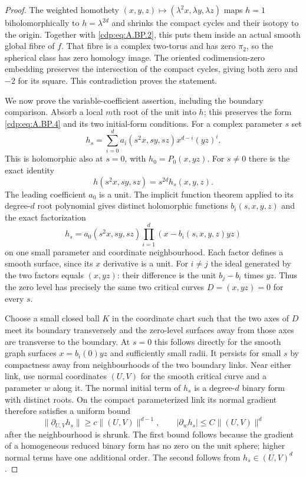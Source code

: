 \begin{proof}
The weighted homothety
$(x,y,z)\mapsto(\lambda^2x,\lambda y,\lambda z)$
maps $h=1$ biholomorphically to $h=\lambda^{2d}$
and shrinks the compact cycles and their isotopy
to the origin. Together with \eqref{cdp:eq:A.BP.2}, this puts
them inside an actual smooth global fibre of $f$.
That fibre is a complex two-torus and has zero
$\pi_2$, so the spherical class has zero homology
image. The oriented codimension-zero embedding
preserves the intersection of the compact cycles,
giving both zero and $-2$ for its square. This
contradiction proves the statement.

We now prove the variable-coefficient assertion,
including the boundary comparison. Absorb a local
$m$th root of the unit into $h$; this preserves the
form \eqref{cdp:eq:A.BP.4} and its two initial-form conditions.
For a complex parameter $s$ set
\[
 h_s=\sum_{i=0}^d a_i(s^2x,sy,sz)x^{d-i}(yz)^i.
                                                        \tag{A.BP.5}\label{cdp:eq:A.BP.5}
\]
This is holomorphic also at $s=0$, with
$h_0=P_0(x,yz)$. For $s\ne0$ there is the exact
identity
\[
       h(s^2x,sy,sz)=s^{2d}h_s(x,y,z).           \tag{A.BP.6}\label{cdp:eq:A.BP.6}
\]
The leading coefficient $a_0$ is a unit. The implicit
function theorem applied to its degree-$d$ root
polynomial gives distinct holomorphic functions
$b_i(s,x,y,z)$ and the exact factorization
\[
       h_s=a_0(s^2x,sy,sz)
                     \prod_{i=1}^d(x-b_i(s,x,y,z)yz)
                                                        \tag{A.BP.7}\label{cdp:eq:A.BP.7}
\]
on one small parameter and coordinate neighbourhood.
Each factor defines a smooth surface, since its
$x$ derivative is a unit. For $i\ne j$ the ideal
generated by the two factors equals $(x,yz)$:
their difference is the unit $b_j-b_i$ times $yz$.
Thus the zero level has precisely the same two
critical curves $D=(x,yz)=0$ for every $s$.

Choose a small closed ball $K$ in the coordinate
chart such that the two axes of $D$ meet its boundary
transversely and the zero-level surfaces away from
those axes are transverse to the boundary. At
$s=0$ this follows directly for the smooth graph
surfaces $x=b_i(0)yz$ and sufficiently small radii.
It persists for small $s$ by compactness away from
neighbourhoods of the two boundary links.
Near either link, use normal coordinates $(U,V)$
for the smooth critical curve and a parameter $w$
along it. The normal initial term of $h_s$ is a
degree-$d$ binary form with distinct roots.
On the compact parameterized link its normal
gradient therefore satisfies a uniform bound
\[
 \|\partial_{U,V}h_s\|\ge c\|(U,V)\|^{d-1},
 \qquad |\partial_w h_s|\le C\|(U,V)\|^d
                                                        \tag{A.BP.8}\label{cdp:eq:A.BP.8}
\]
after the neighbourhood is shrunk. The first bound
follows because the gradient of a homogeneous
reduced binary form has no zero on the unit sphere;
higher normal terms have one additional order.
The second follows from $h_s\in(U,V)^d$.


\end{proof}
